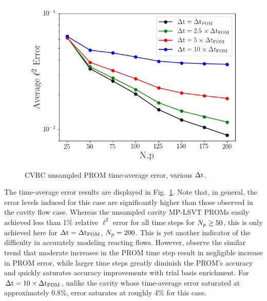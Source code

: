 \begin{figure}
	\centering
	\includegraphics[width=0.7\linewidth]{Chapters/HPROMResults/Images/cvrc/unsampled/unsampled_avg_mode_Average_errorRaw.png}
	\caption{\label{fig:cvrcUnsampledROMErrVsModes}CVRC unsampled PROM time-average error, various $\Delta \text{t}$.}
\end{figure}

The time-average error results are displayed in Fig.~\ref{fig:cvrcUnsampledROMErrVsModes}. Note that, in general, the error levels induced for this case are significantly higher than those observed in the cavity flow case. Whereas the unsampled cavity MP-LSVT PROMs easily achieved less than 1\% relative $\ell^2$ error for all time steps for $N_p \ge 50$, this is only achieved here for $\Delta \text{t} = \Delta \text{t}_{\text{FOM}}$, $N_p = 200$. This is yet another indicator of the difficulty in accurately modeling reacting flows. However, observe the similar trend that moderate increases in the PROM time step result in negligible increase in PROM error, while larger time steps greatly diminish the PROM's accuracy and quickly saturates accuracy improvements with trial basis enrichment. For $\Delta \text{t} = 10 \times \Delta \text{t}_{\text{FOM}}$, unlike the cavity whose time-average error saturated at approximately 0.8\%, error saturates at roughly 4\% for this case.

